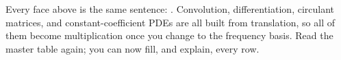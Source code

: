 \begin{strand}
Every face above is the same sentence: . Convolution,
differentiation, circulant matrices, and constant-coefficient PDEs are all built from translation,
so all of them become multiplication once you change to the frequency basis. Read the master table
again; you can now fill, and explain, every row.
\end{strand}

